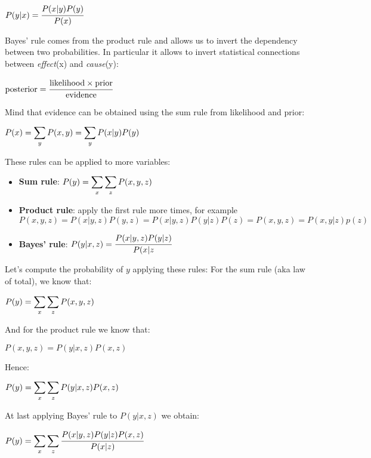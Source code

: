 \begin{definition}
\begin{center}
	$\displaystyle P(y\vert x)=\cfrac{P(x\vert y)P(y)}{P(x)}$
\end{center}
\label{def:BayesRule}
\end{definition}
Bayes' rule comes from the product rule and allows us to invert the dependency between two probabilities. In particular it allows to invert statistical connections between \textit{effect}(x) and \textit{cause}(y):
\begin{center}
	$\displaystyle \text{posterior}=\cfrac{\text{likelihood}\times\text{prior}}{\text{evidence}}$
\end{center}
Mind that evidence can be obtained using the sum rule from likelihood and prior:
\begin{center}
	$\displaystyle P(x)=\displaystyle\sum_{y}P(x,y)=\displaystyle\sum_yP(x\vert y)P(y)$
\end{center}
These rules can be applied to more variables:
\begin{itemize}
	\item \textbf{Sum rule}: $\displaystyle P(y)=\displaystyle\sum_x\displaystyle\sum_z P(x,y,z)$
	\item \textbf{Product rule}: apply the first rule more times, for example $P(x,y,z)=P(x\vert y,z)P(y,z)=P(x\vert y,z)P(y\vert z)P(z)=P(x,y,z)=P(x,y\vert z)p(z)$
	\item \textbf{Bayes' rule}: $\displaystyle P(y\vert x,z)=\cfrac{P(x\vert y,z)P(y\vert z)}{P(x\vert z}$
\end{itemize}
Let's compute the probability of $y$ applying these rules:\newline
For the sum rule (aka law of total), we know that:
\begin{center}
	$\displaystyle P(y)=\displaystyle\sum_x\displaystyle\sum_z P(x,y,z)$
\end{center}
And for the product rule we know that:
\begin{center}
	$\displaystyle P(x,y,z)=P(y\vert x, z)P(x, z)$
\end{center}
Hence:
\begin{center}
	$\displaystyle P(y)=\displaystyle\sum_x\displaystyle\sum_zP(y\vert x, z)P(x, z)$
\end{center}
At last applying Bayes' rule to $P(y\vert x, z)$ we obtain:
\begin{center}
	$\displaystyle P(y)=\displaystyle\sum_x\displaystyle\sum_z \cfrac{P(x\vert y,z)P(y\vert z)P(x, z)}{P(x\vert z)}$
\end{center}
%
%
